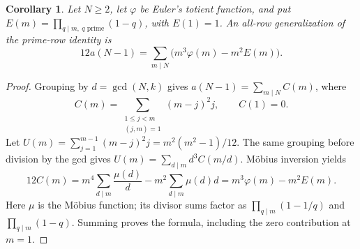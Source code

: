 \documentclass[11pt]{article}
\newtheorem{corollary}[theorem]{Corollary}
\begin{document}
\begin{corollary}\label{cor:allrows}
Let $N\geq2$, let $\varphi$ be Euler's totient function, and put
$E(m)=\prod_{q\mid m,\ q\text{ prime}}(1-q)$, with $E(1)=1$.
An all-row generalization of the prime-row identity is
\[
 12a(N-1)=\sum_{m\mid N}\bigl(m^3\varphi(m)-m^2E(m)\bigr).
\]
\end{corollary}
\begin{proof}
Grouping by $d=\gcd(N,k)$ gives
$a(N-1)=\sum_{m\mid N}C(m)$, where
\[
C(m)=\sum_{\substack{1\leq j<m\\(j,m)=1}}(m-j)^2j,\qquad C(1)=0.
\]
Let $U(m)=\sum_{j=1}^{m-1}(m-j)^2j=m^2(m^2-1)/12$.
The same grouping before division by the gcd gives
$U(m)=\sum_{d\mid m}d^3C(m/d)$.
M\"obius inversion yields
\[
 12C(m)=m^4\sum_{d\mid m}\frac{\mu(d)}d
          -m^2\sum_{d\mid m}\mu(d)d
        =m^3\varphi(m)-m^2E(m).
\]
Here $\mu$ is the M\"obius function; its divisor sums factor as
$\prod_{q\mid m}(1-1/q)$ and $\prod_{q\mid m}(1-q)$.
Summing proves the formula, including the zero contribution at $m=1$.
\end{proof}
\end{document}
